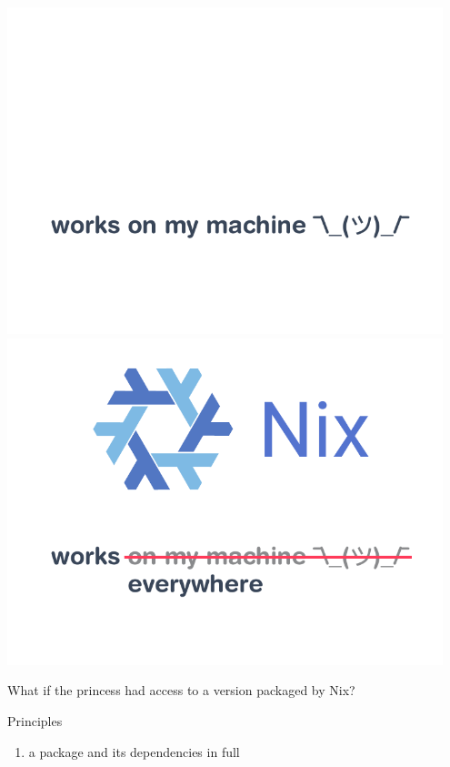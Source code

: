 \documentclass[t, aspectratio=169]{beamer}
\newcommand{\couleur}[2]{{\color{#1}{#2}}}
\begin{document}
\begin{frame}
     {
        \includegraphics[width=0.95\textwidth]{img/schema-nix-motto-pre.pdf}
    }
     {
        \includegraphics[width=0.95\textwidth]{img/schema-nix-motto.pdf}
    }
\end{frame}

\begin{frame}
What if the princess had access to a version packaged by Nix?
\end{frame}

\begin{frame}
    \begin{block}{Principles}
        \begin{enumerate}
            \item<2-> \couleur{blue-portage}{Describe} a package and its
                dependencies in full
         \end{enumerate}
    \end{block}
\end{frame}
\end{document}
